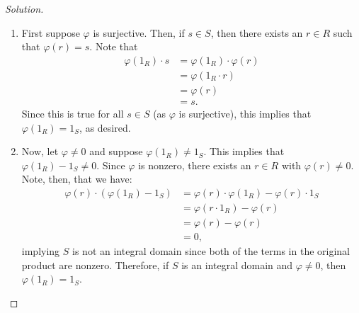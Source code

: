 \documentclass[12pt]{article}
\newenvironment{solution}
  {\renewcommand\qedsymbol{$\blacksquare$}\begin{proof}[Solution]}
{\end{proof}}
\theoremstyle{remark}
\begin{document}
\begin{solution}\ 
  \begin{enumerate}
    \item First suppose $\varphi$ is surjective.
    Then, if $s\in S$, then there exists an $r\in R$ such that $\varphi(r)=s$.
    Note that 
    \begin{align*}
      \varphi(1_R)\cdot s &= \varphi(1_R)\cdot\varphi(r) \\
      &= \varphi(1_R\cdot r) \\
      &= \varphi(r) \\
      &= s.
    \end{align*}
    Since this is true for all $s\in S$ (as $\varphi$ is surjective), this implies that
    $\varphi(1_R) = 1_S$, as desired.

    \item Now, let $\varphi\neq 0$ and suppose $\varphi(1_R)\neq1_S$.
    This implies that $\varphi(1_R)-1_S\neq0$. 
    Since $\varphi$ is nonzero, there exists an $r\in R$ with $\varphi(r)\neq 0$.
    Note, then, that we have:
    \begin{align*}
      \varphi(r)\cdot(\varphi(1_R)-1_S) &=  \varphi(r)\cdot\varphi(1_R) - \varphi(r)\cdot1_S\\
      &= \varphi(r\cdot1_R) - \varphi(r)\\
      &= \varphi(r)-\varphi(r)\\
      &= 0,
    \end{align*}
    implying $S$ is not an integral domain since both of the terms in the original product are nonzero.
    Therefore, if $S$ is an integral domain and $\varphi\neq0$, then $\varphi(1_R)=1_S$.
  \end{enumerate}
\end{solution}
\end{document}

